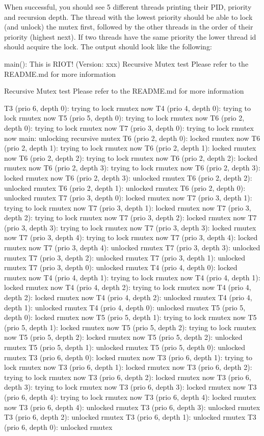 When successful, you should see 5 different threads printing their P\+ID, priority and recursion depth. The thread with the lowest priority should be able to lock (and unlock) the mutex first, followed by the other threads in the order of their priority (highest next). If two threads have the same priority the lower thread id should acquire the lock. The output should look like the following\+:


\begin{DoxyCode}
main(): This is RIOT! (Version: xxx)
Recursive Mutex test
Please refer to the README.md for more information

Recursive Mutex test
Please refer to the README.md for more information

T3 (prio 6, depth 0): trying to lock rmutex now
T4 (prio 4, depth 0): trying to lock rmutex now
T5 (prio 5, depth 0): trying to lock rmutex now
T6 (prio 2, depth 0): trying to lock rmutex now
T7 (prio 3, depth 0): trying to lock rmutex now
main: unlocking recursive mutex
T6 (prio 2, depth 0): locked rmutex now
T6 (prio 2, depth 1): trying to lock rmutex now
T6 (prio 2, depth 1): locked rmutex now
T6 (prio 2, depth 2): trying to lock rmutex now
T6 (prio 2, depth 2): locked rmutex now
T6 (prio 2, depth 3): trying to lock rmutex now
T6 (prio 2, depth 3): locked rmutex now
T6 (prio 2, depth 3): unlocked rmutex
T6 (prio 2, depth 2): unlocked rmutex
T6 (prio 2, depth 1): unlocked rmutex
T6 (prio 2, depth 0): unlocked rmutex
T7 (prio 3, depth 0): locked rmutex now
T7 (prio 3, depth 1): trying to lock rmutex now
T7 (prio 3, depth 1): locked rmutex now
T7 (prio 3, depth 2): trying to lock rmutex now
T7 (prio 3, depth 2): locked rmutex now
T7 (prio 3, depth 3): trying to lock rmutex now
T7 (prio 3, depth 3): locked rmutex now
T7 (prio 3, depth 4): trying to lock rmutex now
T7 (prio 3, depth 4): locked rmutex now
T7 (prio 3, depth 4): unlocked rmutex
T7 (prio 3, depth 3): unlocked rmutex
T7 (prio 3, depth 2): unlocked rmutex
T7 (prio 3, depth 1): unlocked rmutex
T7 (prio 3, depth 0): unlocked rmutex
T4 (prio 4, depth 0): locked rmutex now
T4 (prio 4, depth 1): trying to lock rmutex now
T4 (prio 4, depth 1): locked rmutex now
T4 (prio 4, depth 2): trying to lock rmutex now
T4 (prio 4, depth 2): locked rmutex now
T4 (prio 4, depth 2): unlocked rmutex
T4 (prio 4, depth 1): unlocked rmutex
T4 (prio 4, depth 0): unlocked rmutex
T5 (prio 5, depth 0): locked rmutex now
T5 (prio 5, depth 1): trying to lock rmutex now
T5 (prio 5, depth 1): locked rmutex now
T5 (prio 5, depth 2): trying to lock rmutex now
T5 (prio 5, depth 2): locked rmutex now
T5 (prio 5, depth 2): unlocked rmutex
T5 (prio 5, depth 1): unlocked rmutex
T5 (prio 5, depth 0): unlocked rmutex
T3 (prio 6, depth 0): locked rmutex now
T3 (prio 6, depth 1): trying to lock rmutex now
T3 (prio 6, depth 1): locked rmutex now
T3 (prio 6, depth 2): trying to lock rmutex now
T3 (prio 6, depth 2): locked rmutex now
T3 (prio 6, depth 3): trying to lock rmutex now
T3 (prio 6, depth 3): locked rmutex now
T3 (prio 6, depth 4): trying to lock rmutex now
T3 (prio 6, depth 4): locked rmutex now
T3 (prio 6, depth 4): unlocked rmutex
T3 (prio 6, depth 3): unlocked rmutex
T3 (prio 6, depth 2): unlocked rmutex
T3 (prio 6, depth 1): unlocked rmutex
T3 (prio 6, depth 0): unlocked rmutex


\end{DoxyCode}
